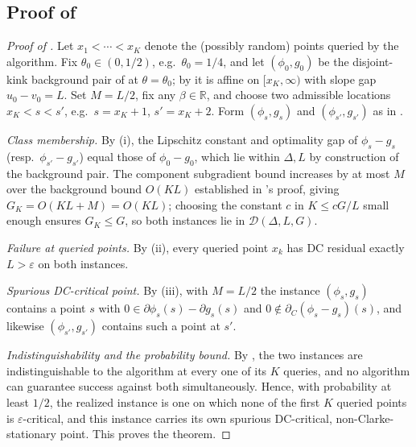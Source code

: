 \subsection{Proof of }
\label{subsec:main-proof}

\begin{proof}[Proof of ]
Let $x_1<\cdots<x_K$ denote the (possibly random) points queried by the
algorithm. Fix $\theta_0\in(0,1/2)$, e.g.\ $\theta_0=1/4$, and let
$(\phi_0,g_0)$ be the disjoint-kink background pair of
 at $\theta=\theta_0$; by
 it is affine on $[x_K,\infty)$ with slope gap
$u_0-v_0=L$. Set $M=L/2$, fix any $\beta\in\mathbb R$, and choose two
admissible locations $x_K<s<s'$, e.g.\ $s=x_K+1$, $s'=x_K+2$. Form
$(\phi_s,g_s)$ and $(\phi_{s'},g_{s'})$ as in .

\emph{Class membership.} By (i), the Lipschitz
constant and optimality gap of $\phi_s-g_s$ (resp.\ $\phi_{s'}-g_{s'}$)
equal those of $\phi_0-g_0$, which lie within $\Delta,L$ by construction
of the background pair. The component subgradient bound increases by at
most $M$ over the background bound $O(KL)$ established in
's proof, giving $G_K=O(KL+M)=O(KL)$; choosing
the constant $c$ in $K\le cG/L$ small enough ensures $G_K\le G$, so both
instances lie in $\mathcal D(\Delta,L,G)$.

\emph{Failure at queried points.} By (ii), every
queried point $x_k$ has DC residual exactly $L>\varepsilon$ on both
instances.

\emph{Spurious DC-critical point.} By (iii), with
$M=L/2$ the instance $(\phi_s,g_s)$ contains a point $s$ with
$0\in\partial\phi_s(s)-\partial g_s(s)$ and $0\notin\partial_C(\phi_s-g_s)(s)$,
and likewise $(\phi_{s'},g_{s'})$ contains such a point at $s'$.

\emph{Indistinguishability and the probability bound.} By
, the two instances are indistinguishable to
the algorithm at every one of its $K$ queries, and no algorithm can
guarantee success against both simultaneously. Hence, with probability at
least $1/2$, the realized instance is one on which none of the first $K$
queried points is $\varepsilon$-critical, and this instance carries its
own spurious DC-critical, non-Clarke-stationary point. This proves the
theorem.
\end{proof}
